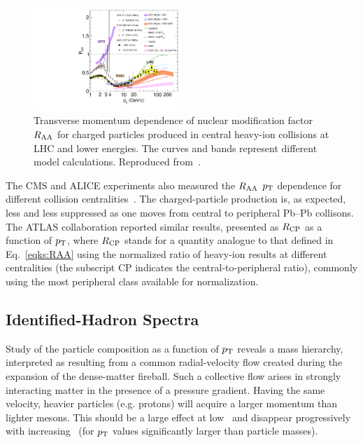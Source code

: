 \begin{figure}
\centering
\includegraphics[width=0.5\textwidth]{particlefigs/CMSRAA.pdf}
\caption{Transverse momentum dependence of nuclear modification factor $R_{\rm AA}$ for charged particles produced in central heavy-ion collisions at LHC and lower energies. The curves and bands represent different model calculations. Reproduced from~\cite{CMS:2012aa}.}
\label{figks:CMSRAA}
\end{figure}

The CMS and ALICE experiments also measured the $R_{\rm AA}$ $p_{\rm T}$ dependence for different collision centralities~\cite{CMS:2012aa,Abelev:2012hxa}. The charged-particle production is, as expected, less and less suppressed as one moves from central to peripheral Pb--Pb collisons. The ATLAS collaboration reported similar results, presented as $R_{\rm CP}$ as a function of $p_{\rm T}$, where $R_{\rm CP}$ stands for a quantity analogue  to that defined in Eq.~\ref{eqks:RAA} using the normalized ratio of heavy-ion results at different centralities (the subscript CP indicates the central-to-peripheral ratio), commonly using the most peripheral class available for normalization.
\subsection{Identified-Hadron Spectra}
\label{subsecks:identspectra}
Study of the particle composition as a function of $p_{\rm T}$ reveals a mass hierarchy, interpreted as resulting from a common radial-velocity flow created during the expansion of the dense-matter fireball. Such a collective flow arises in strongly interacting matter in the presence of a pressure gradient. Having the same velocity, heavier particles (e.g. protons) will acquire a larger momentum than lighter mesons. This should be a large effect at low \pt\ and disappear progressively with increasing \pt\ (for $p_{\rm T}$ values significantly larger than particle masses).

